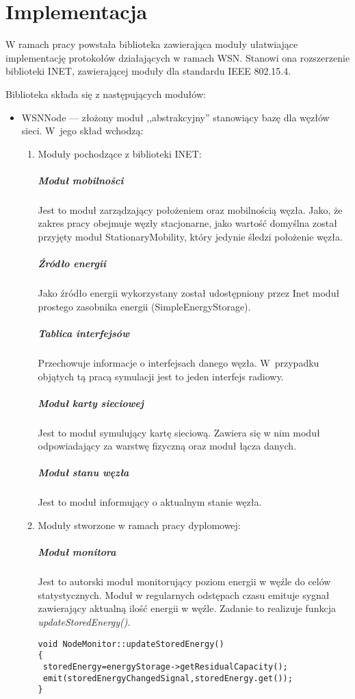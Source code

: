 \chapter{Implementacja}
W ramach pracy powstała biblioteka zawierająca moduły ułatwiające implementację protokołów działających w ramach WSN. Stanowi ona rozszerzenie biblioteki INET, zawierającej moduły dla standardu IEEE 802.15.4.

Biblioteka składa się z następujących modułów:
\begin{itemize}
	\item WSNNode --- złożony moduł ,,abstrakcyjny'' stanowiący bazę dla węzłów sieci. W~jego skład wchodzą:
\begin{enumerate}
\item Moduły pochodzące z biblioteki INET:
\paragraph{Moduł mobilności} Jest to moduł zarządzający położeniem oraz mobilnością węzła. Jako, że zakres pracy obejmuje węzły stacjonarne, jako wartość domyślna został przyjęty moduł StationaryMobility, który jedynie śledzi położenie węzła.
\paragraph{Źródło energii} Jako źródło energii wykorzystany został udostępniony przez Inet moduł prostego zasobnika energii (SimpleEnergyStorage).
\paragraph{Tablica interfejsów} Przechowuje informacje o interfejsach danego węzła. W~przypadku objątych tą pracą symulacji jest to jeden interfejs radiowy.
\paragraph{Moduł karty sieciowej} Jest to moduł symulujący kartę sieciową. Zawiera się w nim moduł odpowiadający za warstwę fizyczną oraz moduł łącza danych.
\paragraph{Moduł stanu węzła} Jest to moduł informujący o aktualnym stanie węzła.
\item Moduły stworzone w ramach pracy dyplomowej:
\paragraph{Moduł monitora} Jest to autorski moduł monitorujący poziom energii w węźle do celów statystycznych. Moduł w regularnych odstępach czasu emituje sygnał zawierający aktualną ilość energii w węźle. Zadanie to realizuje funkcja \textit{updateStoredEnergy()}.
\begin{verbatim}
void NodeMonitor::updateStoredEnergy()
{
 storedEnergy=energyStorage->getResidualCapacity();
 emit(storedEnergyChangedSignal,storedEnergy.get());
}
\end{verbatim}

\end{enumerate}
\end{itemize}
